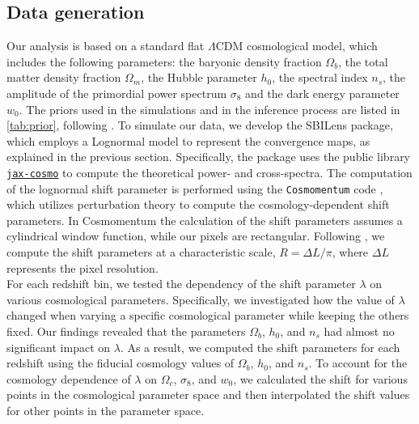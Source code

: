 \documentclass{aa}
\begin{document}
\subsection{Data generation}
Our analysis is based on a standard flat $\Lambda$CDM cosmological model,  which includes the following parameters: the baryonic density fraction $\Omega_b$, the total matter density fraction $\Omega_m$, the Hubble parameter $h_0$, the spectral index $n_s$, the amplitude of the primordial power spectrum $\sigma_8$ and the dark energy parameter $w_0$. The priors used in the simulations and in the inference process are listed in \autoref{tab:prior}, following \citet{zhang2022transitioning}.
To simulate our data, we develop the SBILens package, which employs a Lognormal model to represent the convergence maps, as explained in the previous section. Specifically, the package uses the public library \href{https://github.com/DifferentiableUniverseInitiative/jax_cosmo}{\texttt{jax-cosmo}} \citep{Campagne_2023} to compute the theoretical power- and cross-spectra. The computation of the lognormal shift parameter is performed using the \texttt{Cosmomentum} code \citep{friedrich2018density, friedrich2020primordial}, which utilizes perturbation theory to compute the cosmology-dependent shift parameters. In Cosmomentum the calculation of the shift parameters assumes a cylindrical window function, while our pixels are rectangular. Following \citet{boruah2022map}, we compute the shift parameters at a characteristic scale, $R=\Delta L/\pi$, where $\Delta L$ represents the pixel resolution. \\
For each redshift bin, we tested the dependency of the shift parameter $\lambda$ on various cosmological parameters. Specifically, we investigated how the value of $\lambda$ changed when varying a specific cosmological parameter while keeping the others fixed.
Our findings revealed that the parameters $\Omega_b$, $h_0$, and $n_s$ had almost no significant impact on $\lambda$. As a result, we computed the shift parameters for each redshift using the fiducial cosmology values of $\Omega_b$, $h_0$, and $n_s$.
To account for the cosmology dependence of $\lambda$ on $\Omega_c$, $\sigma_8$, and $w_0$, we calculated the shift for various points in the cosmological parameter space and then interpolated the shift values for other points in the parameter space.
\end{document}
